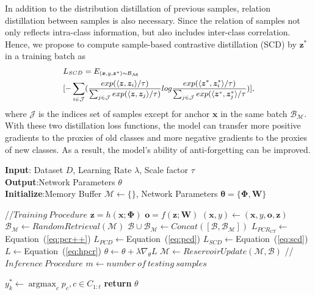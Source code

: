 In addition to the distribution distillation of previous samples, relation distillation between samples is also necessary. Since the relation of samples not only reflects intra-class information, but also includes inter-class correlation. Hence, we propose to compute sample-based contrastive distillation (SCD) by $\bm{z}^*$ in a training batch as
\begin{equation}\small
\label{eq:scd}
\begin{split}
    &
    L_{SCD}=E_{(\bm{x},y,\bm{z}^*)\sim{\mathcal{B}_\mathcal{M}}}\\
    &
    [-\sum_{i\in\mathcal{J}}(\frac{exp(\langle\bm{z},\bm{z}_i\rangle/\tau)}{\sum_{j\in\mathcal{J}}exp(\langle\bm{z},\bm{z}_j\rangle/\tau)}log\frac{exp(\langle\bm{z}^*,\bm{z}^*_i\rangle/\tau)}{\sum_{j\in\mathcal{J}}exp(\langle\bm{z}^*,\bm{z}^*_j\rangle/\tau})],
\end{split}
\end{equation}
where $\mathcal{J}$ is the indices set of samples except for anchor $\bm{x}$ in the same batch $\mathcal{B}_\mathcal{M}$. With these two distillation loss functions, the model can transfer more positive gradients to the proxies of old classes and more negative gradients to the proxies of new classes. As a result, the model's ability of anti-forgetting can be improved.



\begin{algorithm}[t]
\caption{Holistic Proxy-based Contrastive Replay}
\label{alg:hpcr}
\textbf{Input}: Dataset $D$, Learning Rate $\lambda$, Scale factor $\tau$\\
\textbf{Output}:Network Parameters $\theta$\\
\textbf{Initialize}:Memory Buffer $\mathcal{M}\leftarrow\{\}$, Network Parameters $\bm{\theta}=\{\bm{\Phi},\bm{W}\}$
\begin{algorithmic}[1]
\STATE //$Training\ Procedure$
            \STATE $\bm{z}=h(\bm{x};\bm{\Phi})$ 
            \STATE $\bm{o}=f(\bm{z};\bm{W})$
            \STATE $(\bm{x},y)\leftarrow(\bm{x},y,\bm{o},\bm{z})$
        \ENDFOR
        \STATE$\mathcal{B}_\mathcal{M}\leftarrow RandomRetrieval(\mathcal{M})$
        \STATE$\mathcal{B}\cup\mathcal{B}_\mathcal{M}\leftarrow Concat([\mathcal{B},\mathcal{B}_\mathcal{M}])$
        \STATE$L_{PCR_{CT}}\leftarrow$Equation~(\ref{eq:pcr++})
        \STATE$L_{PCD}\leftarrow$Equation~(\ref{eq:pcd})
        \STATE$L_{SCD}\leftarrow$Equation~(\ref{eq:scd})
        \STATE$L\leftarrow$Equation~(\ref{eq:hpcr})
        \STATE$\theta\leftarrow\theta+\lambda\nabla_{\theta}L$
        \STATE$\mathcal{M}\leftarrow ReservoirUpdate(\mathcal{M},\mathcal{B})$
    \ENDFOR
\STATE //$Inference\ Procedure$
\STATE $m\leftarrow number\ of\ testing\ samples$

    \STATE $y_k^*\leftarrow \mathop{\arg\max}_{c}p_c,c\in C_{1:t}$
    \ENDFOR
\STATE \textbf{return} $\theta$
\ENDFOR
\end{algorithmic}
\end{algorithm}

